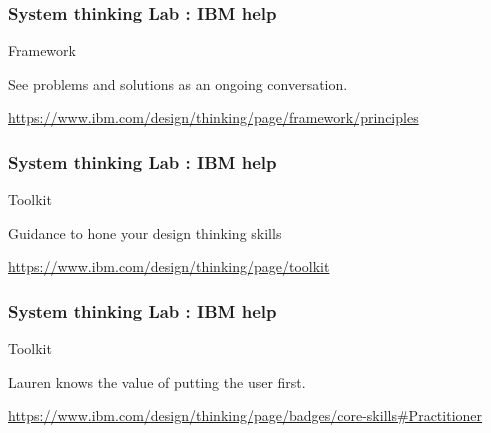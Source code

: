 \newpage

\begin{frame}
\frametitle{ System thinking Lab : IBM help }
\begin{block}{ Framework }

See problems and solutions as an ongoing conversation.

\url{https://www.ibm.com/design/thinking/page/framework/principles}

\end{block}
\end{frame}


\newpage

\begin{frame}
\frametitle{ System thinking Lab : IBM help }
\begin{block}{ Toolkit }

Guidance to hone your design thinking skills

\url{https://www.ibm.com/design/thinking/page/toolkit}

\end{block}
\end{frame}



\newpage

\begin{frame}
\frametitle{ System thinking Lab : IBM help }
\begin{block}{ Toolkit }

Lauren knows the value of putting the user first.

\url{https://www.ibm.com/design/thinking/page/badges/core-skills#Practitioner }

\end{block}
\end{frame}
